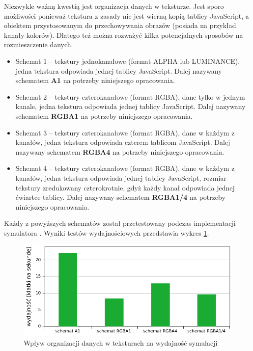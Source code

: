 Niezwykle ważną kwestią jest organizacja danych w teksturze. Jest sporo
możliwości ponieważ tekstura z zasady nie jest wierną kopią tablicy JavaScript,
a obiektem przystosowanym do przechowywania obrazów (posiada na przykład kanały
kolorów). Dlatego też można rozważyć kilka potencjalnych sposobów na
rozmieszczenie danych.

\begin{itemize}

\item Schemat 1 -- tekstury jednokanałowe (format ALPHA lub LUMINANCE), jedna
tekstura odpowiada jednej tablicy JavaScript. Dalej nazywany schematem
\textbf{A1} na potrzeby niniejszego opracowania.

\item Schemat 2 -- tekstury czterokanałowe (format RGBA), dane tylko w jednym
kanale, jedna tekstura odpowiada jednej tablicy JavaScript. Dalej nazywany
schematem \textbf{RGBA1} na potrzeby niniejszego opracowania.

\item Schemat 3 -- tekstury czterokanałowe (format RGBA), dane w każdym z
kanałów, jedna tekstura odpowiada czterem tablicom JavaScript. Dalej nazywany
schematem \textbf{RGBA4} na potrzeby niniejszego opracowania.

\item Schemat 4 -- tekstury czterokanałowe (format RGBA), dane w każdym z
kanałów, jedna tekstura odpowiada jednej tablicy JavaScript, rozmiar tekstury
zredukowany czterokrotnie, gdyż każdy kanał odpowiada jednej ćwiartce tablicy.
Dalej nazywany schematem \textbf{RGBA1/4} na potrzeby niniejszego opracowania.

\end{itemize}

Każdy z powyższych schematów został przetestowany podczas implementacji
symulatora . Wyniki testów wydajnościowych przedstawia wykres
\ref{fig:texPerf}.

\begin{figure}[!h]
\centering
\includegraphics[width=.9\textwidth]{img/texPerf}
\caption{Wpływ organizacji danych w teksturach na wydajność symulacji 
}
\label{fig:texPerf}
\end{figure}

